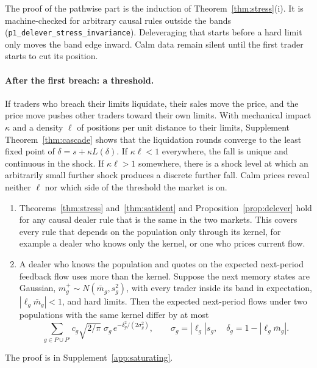 The proof of the pathwise part is the induction of Theorem~\ref{thm:stress}(i). It is machine-checked for arbitrary causal rules outside the bands (\texttt{p1\_delever\_stress\_invariance}). Deleveraging that starts before a hard limit only moves the band edge inward. Calm data remain silent until the first trader starts to cut its position.

\paragraph{After the first breach: a threshold.} If traders who breach their limits liquidate, their sales move the price, and the price move pushes other traders toward their own limits. With mechanical impact $\kappa$ and a density $\ell$ of positions per unit distance to their limits, Supplement Theorem~\ref{thm:cascade} shows that the liquidation rounds converge to the least fixed point of $\delta=s+\kappa L(\delta)$. If $\kappa\ell<1$ everywhere, the fall is unique and continuous in the shock. If $\kappa\ell>1$ somewhere, there is a shock level at which an arbitrarily small further shock produces a discrete further fall. Calm prices reveal neither $\ell$ nor which side of the threshold the market is on.

\begin{proposition}\label{prop:dealers}
\begin{enumerate}[label=(\roman*),itemsep=1pt]
\item Theorems~\ref{thm:stress} and~\ref{thm:satident} and Proposition~\ref{prop:delever} hold for any causal dealer rule that is the same in the two markets. This covers every rule that depends on the population only through its kernel, for example a dealer who knows only the kernel, or one who prices current flow.
\item A dealer who knows the population and quotes on the expected next-period feedback flow uses more than the kernel. Suppose the next memory states are Gaussian, $m^+_g\sim N(\bar m_g,s_g^2)$, with every trader inside its band in expectation, $|\ell_g\bar m_g|<1$, and hard limits. Then the expected next-period flows under two populations with the same kernel differ by at most
\[
 \sum_{g\in P\cup P'}c_g\sqrt{2/\pi}\;\sigma_g\,e^{-\delta_g^2/(2\sigma_g^2)},\qquad \sigma_g=|\ell_g|s_g,\quad\delta_g=1-|\ell_g\bar m_g|.
\]
\end{enumerate}
\end{proposition}

The proof is in Supplement~\ref{app:saturating}.

